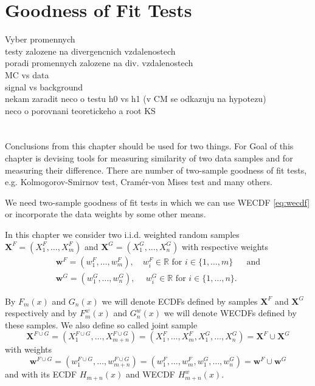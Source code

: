 \chapter{Goodness of Fit Tests}
\label{ch:GoF}

Vyber promennych \\
testy zalozene na divergencnich vzdalenostech \\
poradi promennych zalozene na div. vzdalenostech\\
 MC vs data\\
signal vs background \\
nekam zaradit neco o testu h0 vs h1 (v CM se odkazuju na hypotezu) \\
neco o porovnani teoretickeho a root KS \\
\\
\\


Conclusions from this chapter should be used for two things. For 
\noindent Goal of this chapter is devising tools for measuring similarity of two data samples and for measuring their difference. There are number of two-sample goodness of fit  tests, e.g. Kolmogorov-Smirnov test, Cram\'{e}r-von Mises test and many others. 

We need two-sample goodness of fit  tests in which we can use WECDF \ref{eq:wecdf} or incorporate the data weights by some other means.

In this chapter we consider two i.i.d. weighted random samples $\mathbf{X}^F = (X^F_1,\ldots, X^F_m)$ and $\mathbf{X}^G = (X^G_1, \ldots, X^G_n)$ with respective weights 
\begin{align*}
\mathbf{w}^F = (w^F_1,\ldots, w^F_m), \quad w_i^F \in \mathbb{R} \text{ for }  i \in \lbrace 1, \ldots, m \rbrace &\text{ and} \\
\mathbf{w}^G = (w^G_1,\ldots, w^G_n), \:
\quad w_i^G \in \mathbb{R} \text{ for } i \in \lbrace 1, \ldots, n \rbrace. &
\end{align*}

By $F_m(x) $ and $ G_n(x)$ we will denote ECDFs defined by samples $\mathbf{X}^F$ and $\mathbf{X}^G$ respectively and by $F^w_m(x)$ and $ G^w_n(x)$ we will denote WECDFs defined by these samples. We also define so called joint sample 
\begin{equation}
\mathbf{X}^{F\cup G} = (X^{F\cup G}_1, \ldots, X^{F\cup G}_{m+n}) = (X^{F}_1, \ldots, X^{F}_{m},X^G_1,\ldots, X^G_n) = \mathbf{X}^{F} \cup \mathbf{X}^{G}
\end{equation}
with weights 
\begin{equation}
\mathbf{w}^{F\cup G} = (w^{F\cup G}_1,\ldots, w^{F\cup G}_{m+n}) = (w^{F}_1,\ldots, w^{F}_{m},w^{G}_1,\ldots, w^{G}_{n}) = \mathbf{w}^{F} \cup \mathbf{w}^{G}
\end{equation}
and with its ECDF $H_{m+n}(x)$ and WECDF $H^w_{m+n}(x)$.

